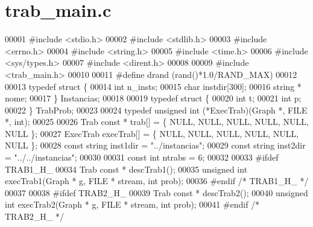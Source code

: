 \section{trab\+\_\+main.\+c}
\label{trab__main_8c_source}

\begin{DoxyCode}
00001 \textcolor{preprocessor}{#include <stdio.h>}
00002 \textcolor{preprocessor}{#include <stdlib.h>}
00003 \textcolor{preprocessor}{#include <errno.h>}
00004 \textcolor{preprocessor}{#include <string.h>}
00005 \textcolor{preprocessor}{#include <time.h>}
00006 \textcolor{preprocessor}{#include <sys/types.h>}
00007 \textcolor{preprocessor}{#include <dirent.h>}
00008 
00009 \textcolor{preprocessor}{#include <trab_main.h>}
00010 
00011 \textcolor{preprocessor}{#define drand (rand()*1.0/RAND\_MAX)}
00012 
00013 \textcolor{keyword}{typedef} \textcolor{keyword}{struct }\{
00014         \textcolor{keywordtype}{int} n\_insts;
00015         \textcolor{keywordtype}{char} instdir[300];
00016         \textcolor{keywordtype}{string} * nome;
00017 \} Instancias;
00018 
00019 \textcolor{keyword}{typedef} \textcolor{keyword}{struct }\{
00020         \textcolor{keywordtype}{int} t;
00021         \textcolor{keywordtype}{int} p;
00022 \} TrabProb;
00023 
00024 \textcolor{keyword}{typedef} \textcolor{keywordtype}{unsigned} int (*ExecTrab)(Graph *, FILE *, int);
00025 
00026 Trab \textcolor{keyword}{const} * trab[] = \{ NULL, NULL, NULL, NULL, NULL, NULL \};
00027 ExecTrab execTrab[] = \{ NULL, NULL, NULL, NULL, NULL, NULL \};
00028 \textcolor{keyword}{const} \textcolor{keywordtype}{string} inst1dir = \textcolor{stringliteral}{"../instancias"};
00029 \textcolor{keyword}{const} \textcolor{keywordtype}{string} inst2dir = \textcolor{stringliteral}{"../../instancias"};
00030 
00031 \textcolor{keyword}{const} \textcolor{keywordtype}{int} ntrabs = 6;
00032 
00033 \textcolor{preprocessor}{#ifdef TRAB1\_H\_}
00034 Trab \textcolor{keyword}{const} * descTrab1();
00035 \textcolor{keywordtype}{unsigned} \textcolor{keywordtype}{int} execTrab1(Graph * g, FILE * stream, \textcolor{keywordtype}{int} prob);
00036 \textcolor{preprocessor}{#endif }\textcolor{comment}{/* TRAB1\_H\_ */}\textcolor{preprocessor}{}
00037 
00038 \textcolor{preprocessor}{#ifdef TRAB2\_H\_}
00039 Trab \textcolor{keyword}{const} * descTrab2();
00040 \textcolor{keywordtype}{unsigned} \textcolor{keywordtype}{int} execTrab2(Graph * g, FILE * stream, \textcolor{keywordtype}{int} prob);
00041 \textcolor{preprocessor}{#endif }\textcolor{comment}{/* TRAB2\_H\_ */}\textcolor{preprocessor}{}

\end{DoxyCode}
